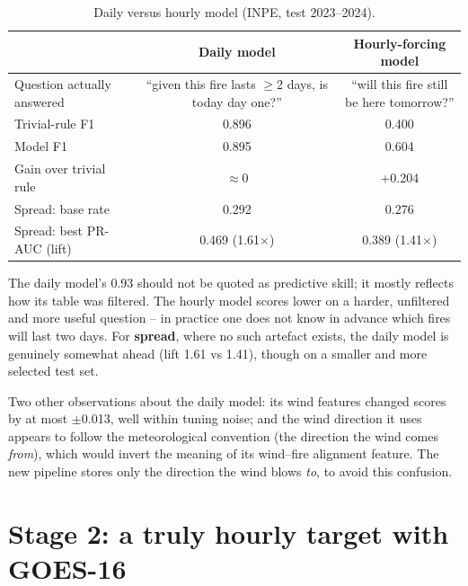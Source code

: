 \documentclass[11pt,a4paper,oneside]{report}
\begin{document}
\begin{table}[H]
\centering\small
\caption{Daily versus hourly model (INPE, test 2023--2024).}
\label{tab:daily-vs-hourly}
\begin{tabular}{lcc}
\toprule
 & Daily model & Hourly-forcing model \\
\midrule
Question actually answered & \makecell{``given this fire lasts $\geq$2 days,\\ is today day one?''} & \makecell{``will this fire still\\ be here tomorrow?''} \\
Trivial-rule F1 & 0.896 & 0.400 \\
Model F1 & 0.895 & 0.604 \\
Gain over trivial rule & $\approx 0$ & +0.204 \\
\midrule
Spread: base rate & 0.292 & 0.276 \\
Spread: best PR-AUC (lift) & 0.469 (1.61$\times$) & 0.389 (1.41$\times$) \\
\bottomrule
\end{tabular}
\end{table}

\begin{keybox}
The daily model's 0.93 should not be quoted as predictive skill; it mostly
reflects how its table was filtered. The hourly model scores lower on a harder,
unfiltered and more useful question -- in practice one does not know in advance
which fires will last two days. For \textbf{spread}, where no such artefact
exists, the daily model is genuinely somewhat ahead (lift 1.61 vs 1.41), though
on a smaller and more selected test set.
\end{keybox}

Two other observations about the daily model: its wind features changed scores
by at most $\pm$0.013, well within tuning noise; and the wind direction it uses
appears to follow the meteorological convention (the direction the wind comes
\emph{from}), which would invert the meaning of its wind--fire alignment feature.
The new pipeline stores only the direction the wind blows \emph{to}, to avoid
this confusion.

\chapter{Stage 2: a truly hourly target with GOES-16}\label{ch:goes}
\end{document}
